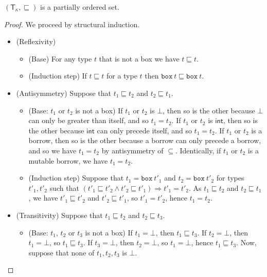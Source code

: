 \begin{lemma}
  \label{lemma:partial-order-types}
  $(\mathsf{T}_\kappa,\sqsubseteq)$ is a partially ordered set.
\end{lemma}
\begin{proof}
  We proceed by structural induction.
  \begin{itemize}
    \item (Reflexivity)
    \begin{itemize}
      \item (Base) For any type $t$ that is not a box we have
      $t\sqsubseteq t$.
      \item (Induction step) If $t\sqsubseteq t$ for a type $t$ then
      $\mathtt{box}\ t\sqsubseteq \mathtt{box}\ t$.
    \end{itemize}
    \item (Antisymmetry) Suppose that $t_1 \sqsubseteq t_2$ and
    $t_2 \sqsubseteq t_1$.
    \begin{itemize}
      \item (Base: $t_1$ or $t_2$ is not a box)
      If $t_1$ or $t_2$ is $\bot$, then so is the other
      because $\bot$ can only be greater than itself, and so $t_1 = t_2$.
      If $t_1$ or $t_2$ is $\mathsf{int}$, then so is the other
      because $\mathsf{int}$ can only precede itself, and so $t_1 = t_2$.
      If $t_1$ or $t_2$ is a borrow, then so is the other because
      a borrow can only precede a borrow, and so we have $t_1 = t_2$
      by antisymmetry of $\subseteq$.
      Identically, if $t_1$ or $t_2$ is a mutable borrow, we have $t_1 = t_2$.
      \item (Induction step) Suppose that $t_1=\mathtt{box}\ t'_1$ and
      $t_2=\mathtt{box}\ t'_2$ for types $t'_1,t'_2$ such that
      $(t'_1 \sqsubseteq t'_2 \land t'_2 \sqsubseteq t'_1) \Rightarrow t'_1 = t'_2$.
      As $t_1 \sqsubseteq t_2$ and $t_2 \sqsubseteq t_1$, we have
      $t'_1 \sqsubseteq t'_2$ and $t'_2 \sqsubseteq t'_1$, so
      $t'_1 = t'_2$, hence $t_1 = t_2$.
    \end{itemize}
    \item (Transitivity) Suppose that $t_1 \sqsubseteq t_2$ and
    $t_2 \sqsubseteq t_3$.
    \begin{itemize}
      \item (Base: $t_1$, $t_2$ or $t_3$ is not a box)
      If $t_1=\bot$, then $t_1\sqsubseteq t_3$.
      If $t_2=\bot$, then $t_1=\bot$, so $t_1\sqsubseteq t_3$.
      If $t_3=\bot$, then $t_2=\bot$, so $t_1=\bot$, hence $t_1\sqsubseteq t_3$.
      Now, suppose that none of $t_1,t_2,t_3$ is $\bot$.

\end{itemize}
\end{itemize}
\end{proof}
